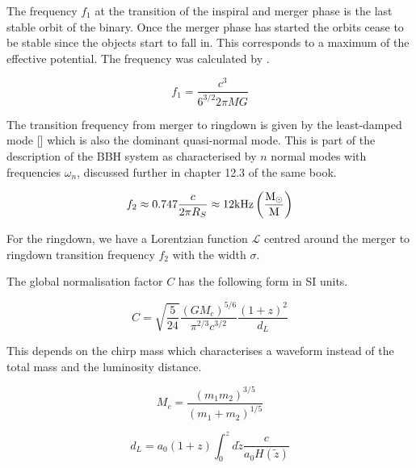 The frequency $f_1$ at the transition of the inspiral and merger phase is the last stable orbit of the binary. Once the merger phase has started the orbits cease to be stable since the objects start to fall in. This corresponds to a maximum of the effective potential. The frequency was calculated by \cite{bardeen_rotating_1972}.

\begin{equation}
    f_1 = \frac{c^3}{6^{3/2}2\pi M G}
\end{equation}

The transition frequency from merger to ringdown is given by the least-damped mode [\cite{maggiore_gravitational_2008}] which is also the dominant quasi-normal mode. This is part of the description of the BBH system as characterised by $n$ normal modes with frequencies $\omega_n$, discussed further in chapter 12.3 of the same book.

\begin{equation}
    f_2 \approx 0.747 \frac{c}{2\pi R_S} \approx 12 \rm{kHz} \left( \frac{M_\odot}{M}\right)
\end{equation}

For the ringdown, we have a Lorentzian function $\mathcal{L}$ centred around the merger to ringdown transition frequency $f_2$ with the width $\sigma$.

The global normalisation factor $C$ has the following form in SI units.

\begin{equation}
    C = \sqrt{\frac{5}{24}}\frac{(GM_c)^{5/6}}{\pi^{2/3}c^{3/2}}\frac{(1+z)^2}{d_L}
\end{equation}

This depends on the chirp mass which characterises a waveform instead of the total mass and the luminosity distance.

\begin{equation}
    M_c = \frac{(m_1m_2)^{3/5}}{(m_1+m_2)^{1/5}}
\end{equation}

\begin{equation}
    d_L = a_0 (1+z)\int_0^z d\tilde{z}\frac{c}{a_0 H(\tilde{z})}
\end{equation}

